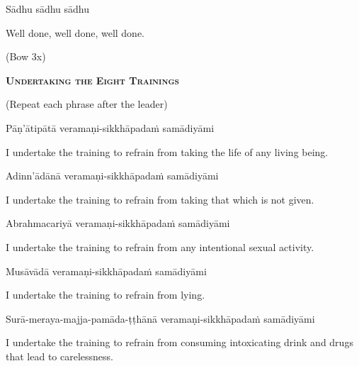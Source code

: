 Sādhu sādhu sādhu

\begin{english}
  Well done, well done, well done.
\end{english}

\begin{center}
  (Bow 3x)
\end{center}

\clearpage



\begin{center}
  \textbf{\textsc{Undertaking the Eight Trainings}}
\end{center}
\begin{center}
  (Repeat each phrase after the leader)
\end{center}

Pāṇ'ātipātā veramaṇi-sikkhāpadaṁ samādiyāmi

\begin{english-hang}
  I undertake the training to refrain from taking the life of any living being.
\end{english-hang}

Adinn'ādānā veramaṇi-sikkhāpadaṁ samādiyāmi

\begin{english-hang}
  I undertake the training to refrain from taking that which is not given.
\end{english-hang}

Abrahmacariyā veramaṇi-sikkhāpadaṁ samādiyāmi

\begin{english-hang}
  I undertake the training to refrain from any intentional sexual activity.
\end{english-hang}

Musāvādā veramaṇi-sikkhāpadaṁ samādiyāmi

\begin{english}
  I undertake the training to refrain from lying.
\end{english}

\begin{pali-hang}
  Surā-meraya-majja-pamāda-ṭṭhānā veramaṇi-sikkhāpadaṁ samādiyāmi
\end{pali-hang}

\begin{english-hang}
  I undertake the training to refrain from consuming intoxicating drink and drugs that\ifdigital\makeatletter\hyperlink{endnote141-appendix}\makeatother\fi
  lead to carelessness.
\end{english-hang}


